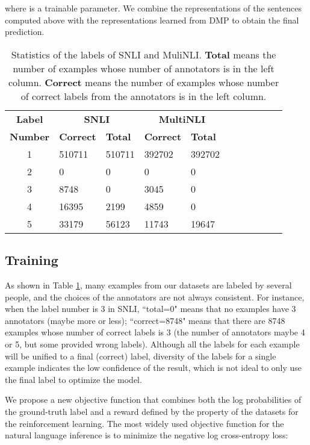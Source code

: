 \documentclass[11pt,letterpaper]{article}
\begin{document}
where  is a trainable parameter. We combine the representations of the sentences computed above with the representations learned from DMP to obtain the final prediction.


 \begin{table}[t]
	\centering
	\begin{tabular}{c|lp{1cm}lp{1cm}lp{1cm}lp{1cm}lp{1cm}}
		\hline
		\multicolumn{1}{c|}{\textbf{Label}} & \multicolumn{2}{c}{\textbf{SNLI}} &  \multicolumn{2}{c}{\textbf{MultiNLI}} \\ \cline{2-5} 
		\multicolumn{1}{c|}{\textbf{Number}}                        & \textbf{Correct}          & \textbf{Total}    & \textbf{Correct}     & \textbf{Total}      \\ \hline
		1    &  510711 & 510711 & 392702  &  392702     \\
		2   & 0 & 0    & 0   &  0 \\
		3 & 8748 & 0     & 3045  &  0  \\
		4 &  16395 & 2199  & 4859  & 0 \\ 
		5    &  33179 & 56123 & 11743 &  19647     \\
		\hline
	\end{tabular}
	\vspace{2mm}
	\caption{Statistics of the labels of SNLI and MuliNLI. \textbf{Total} means the number of examples whose number of annotators is in the left column. \textbf{Correct} means the number of examples whose number of correct labels from the annotators is in the left column. }     
	\label{tab2}  
\end{table}


\subsection{Training}
As shown in Table \ref{tab2}, many examples from our datasets are labeled by several people, and the choices of the annotators are not always consistent. For instance, when the label number is 3 in SNLI, ``total=0" means that no examples have 3 annotators (maybe more or less); ``correct=8748" means that there are 8748 examples whose number of correct labels is 3 (the number of annotators maybe 4 or 5, but some provided wrong labels). Although all the labels for each example will be unified to a final (correct) label, diversity of the labels for a single example indicates the low confidence of the result, which is not ideal to only use the final label to optimize the model. 

We propose a new objective function that combines both the log probabilities of the ground-truth label and a reward defined by the property of the datasets for the reinforcement learning. The most widely used objective function for the natural language inference is to minimize the negative log cross-entropy loss:
\end{document}
